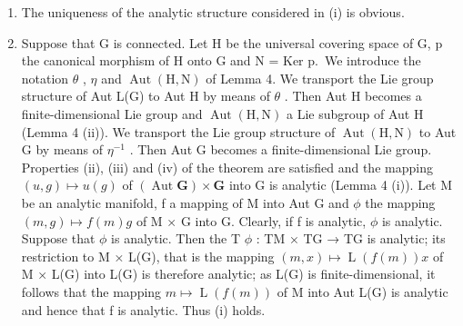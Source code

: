 \begin{enumerate}
\def\labelenumi{(\alph{enumi})}
\item
  The uniqueness of the analytic structure considered in (i) is obvious.
\item
  Suppose that G is connected. Let H be the universal covering space of G, p the canonical morphism of H onto G and N = Ker p.~We introduce the notation \(\theta\) , \(\eta\) and \(\operatorname{Aut}(\mathrm{H},\mathrm{N})\) of Lemma 4. We transport the Lie group structure of Aut L(G) to Aut H by means of \(\theta\) . Then Aut H becomes a finite-dimensional Lie group and \(\operatorname{Aut}(\mathrm{H},\mathrm{N})\) a Lie subgroup of Aut H (Lemma 4 (ii)). We transport the Lie group structure of \(\operatorname{Aut}(\mathrm{H},\mathrm{N})\) to Aut G by means of \(\eta^{-1}\) . Then Aut G becomes a finite-dimensional Lie group. Properties (ii), (iii) and (iv) of the theorem are satisfied and the mapping \((u,g)\mapsto u(g)\) of \((\operatorname{Aut}\mathbf{G})\times\mathbf{G}\) into G is analytic (Lemma 4 (i)). Let M be an analytic manifold, f a mapping of M into Aut G and \(\phi\) the mapping \((m,g)\mapsto f(m)g\) of M × G into G. Clearly, if f is analytic, \(\phi\) is analytic. Suppose that \(\phi\) is analytic. Then the T \(\phi\) : TM × TG → TG is analytic; its restriction to M × L(G), that is the mapping \((m,x)\mapsto\operatorname{L}(f(m))x\) of M × L(G) into L(G) is therefore analytic; as L(G) is finite-dimensional, it follows that the mapping \(m\mapsto\operatorname{L}(f(m))\) of M into Aut L(G) is analytic and hence that f is analytic. Thus (i) holds.
\end{enumerate}

